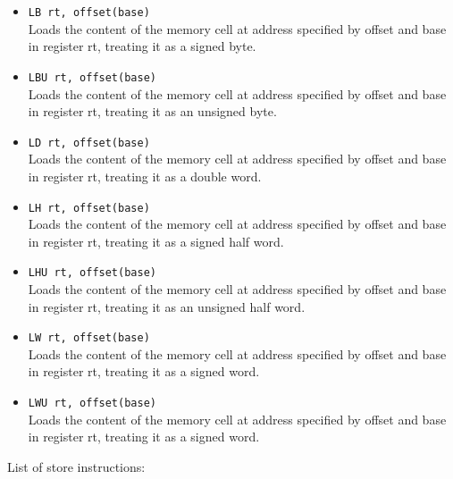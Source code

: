 \documentclass[12pt]{report}
\begin{document}
\begin{itemize}
	\item \texttt{LB rt, offset(base)}\\
	Loads the content of the memory cell at address specified by offset
	and base in register rt, treating it as a signed byte.

	\item \texttt{LBU rt, offset(base)}\\
	Loads the content of the memory cell at address specified by offset
	and base in register rt, treating it as an unsigned byte.

	\item \texttt{LD rt, offset(base)}\\
	Loads the content of the memory cell at address specified by offset
	and base in register rt, treating it as a double word.

	\item \texttt{LH rt, offset(base)}\\
	Loads the content of the memory cell at address specified by offset
	and base in register rt, treating it as a signed half word.

	\item \texttt{LHU rt, offset(base)}\\
	Loads the content of the memory cell at address specified by offset
	and base in register rt, treating it as an unsigned half word.

	\item \texttt{LW rt, offset(base)}\\
	Loads the content of the memory cell at address specified by offset
	and base in register rt, treating it as a signed word.

	\item \texttt{LWU rt, offset(base)}\\
	Loads the content of the memory cell at address specified by offset
	and base in register rt, treating it as a signed word.
\end{itemize}

List of store instructions:
\end{document}
